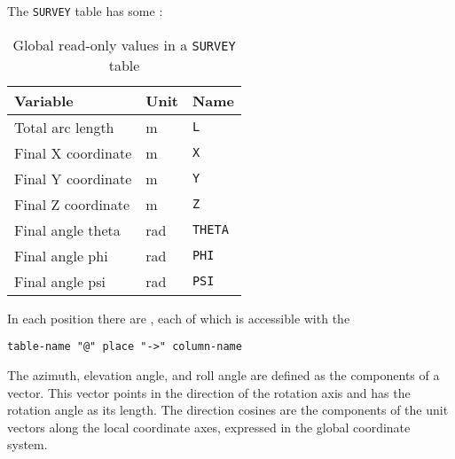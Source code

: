 The \texttt{SURVEY} table has some :
\begin{table}[Ht] \footnotesize
  \begin{center}
    \caption{Global read-only values in a \texttt{SURVEY} table}
    \label{tab:survey_glob}
    \begin{tabular}{|l|l|l|}
      \hline
      Variable & Unit & Name \\
      \hline
      Total arc length & m & \texttt{L}\index{L} \\
      Final X coordinate & m & \texttt{X}\index{X} \\
      Final Y coordinate & m & \texttt{Y}\index{Y} \\
      Final Z coordinate & m & \texttt{Z}\index{Z} \\
      Final angle theta & rad & \texttt{THETA}\index{THETA} \\
      Final angle phi & rad & \texttt{PHI}\index{PHI} \\
      Final angle psi & rad & \texttt{PSI}\index{PSI} \\
      \hline
    \end{tabular}
  \end{center}
\end{table}

In each position there are , 
each of which is accessible with the 
\begin{verbatim}
table-name "@" place "->" column-name
\end{verbatim}
The azimuth, elevation angle, and roll angle are defined as the
components of a vector.
This vector points in the direction of the rotation axis and has the
rotation angle as its length.
The direction cosines are the components of the unit vectors along the
local coordinate axes, expressed in the global coordinate system.


